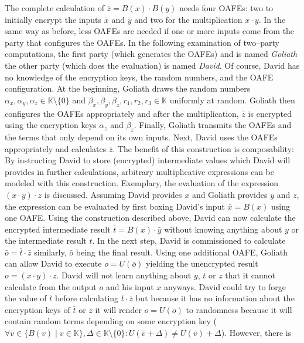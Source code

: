 \noindent{}The complete calculation of $\bar{z} = B(x) \cdot B(y)$ needs four
OAFEs: two to initially encrypt the inputs $\bar x$ and $\bar y$ and two for the
multiplication $x \cdot y$. In the same way as before, less OAFEs are needed if
one or more inputs come from the party that configures the OAFEs. In the
following examination of two--party computations, the first party (which
generates the OAFEs) and is named \emph{Goliath} the other party (which does the
evaluation) is named \emph{David}. Of course, David has no knowledge of the
encryption keys, the random numbers, and the OAFE configuration. At the
beginning, Goliath draws the random numbers $\alpha_x, \alpha_y, \alpha_z \in
\mathbb{K} \setminus \{0\}$ and $\beta_x, \beta_y, \beta_z, r_1, r_2, r_3 \in
\mathbb{K}$ uniformly at random.  Goliath then configures the OAFEs
appropriately and after the multiplication, $\bar{z}$ is encrypted using the
encryption keys $\alpha_z$ and $\beta_z$. Finally, Goliath transmits the OAFEs
and the terms that only depend on its own inputs. Next, David uses the OAFEs
appropriately and calculates $\bar{z}$. The benefit of this construction is
composability: By instructing David to store (encrypted) intermediate values
which David will provides in further calculations, arbitrary multiplicative
expressions can be modeled with this construction. Exemplary, the evaluation of
the expression $(x \cdot y) \cdot z$ is discussed. Assuming David provides $x$
and Goliath provides $y$ and $z$, the expression can be evaluated by first
boxing David's input $\bar{x} = B(x)$ using one OAFE. Using the construction
described above, David can now calculate the encrypted intermediate result
$\bar{t} = B(x) \cdot \bar{y}$ without knowing anything about $y$ or the
intermediate result $t$. In the next step, David is commissioned to calculate
$\bar{o} = \bar{t} \cdot \bar{z}$ similarly, $\bar{o}$ being the final result.
Using one additional OAFE, Goliath can allow David to execute $o = U(\bar{o})$
yielding the unencrypted result $o = (x \cdot y) \cdot z$. David will not learn
anything about $y$, $t$ or $z$ that it cannot calculate from the output $o$ and
his input $x$ anyways. David could try to forge the value of $\bar{t}$ before
calculating $\bar{t} \cdot \bar{z}$ but because it has no information about the
encryption keys of $\bar{t}$ or $\bar{z}$ it will render $o = U(\bar{o})$ to
randomness because it will contain random terms depending on some encryption key
($\forall \bar{v} \in \{B(v) \mid v \in \mathbb{K}\}, \Delta \in \mathbb{K}
\setminus \{0\}: U(\bar{v}+\Delta) \neq U(\bar{v})+\Delta$).  However, there is
